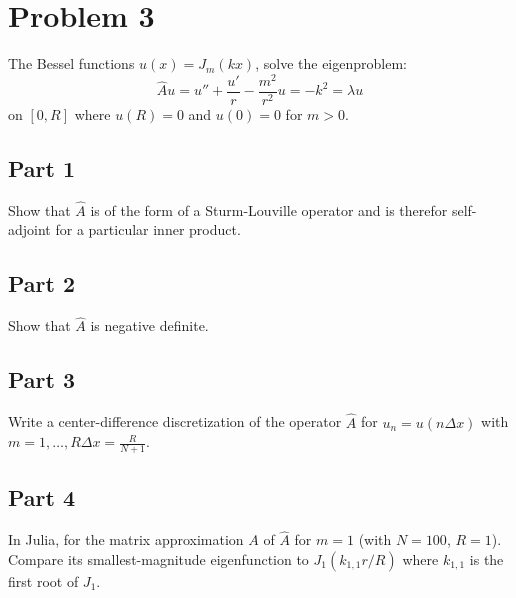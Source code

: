\documentclass{amsart}
\begin{document}
	\section{Problem 3}
	The Bessel functions $u(x) = J_m(kx)$, solve the eigenproblem:
	\[
	\hat{A}u = u'' + \frac{u'}{r} - \frac{m^2}{r^2}u = -k^2 = \lambda u
	\]
	on $[0,R]$ where $u(R)=0$ and $u(0)=0$ for $m>0$.
	\\
	\subsection{Part 1}
	Show that $\hat{A}$ is of the form of a Sturm-Louville operator and is therefor self-adjoint for a particular inner product.
	\\
	\subsection{Part 2}
	Show that $\hat{A}$ is negative definite.
	\\
	\subsection{Part 3}
	Write a center-difference discretization of the operator $\hat{A}$ for $u_n = u(n\Delta x)$ with $m=1,\dots,R \Delta x = \frac{R}{N+1}$.
	\\
	\subsection{Part 4}
	In Julia, for the matrix approximation $A$ of $\hat{A}$ for $m=1$ (with $N=100$, $R=1$). Compare its smallest-magnitude eigenfunction to $J_1(k_{1,1}r/R)$ where $k_{1,1}$ is the first root of $J_1$. 
	
\end{document}

